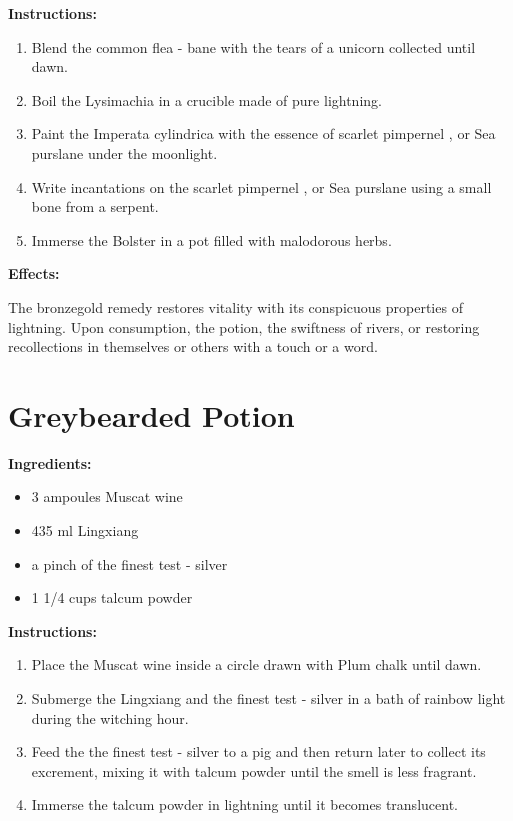 \documentclass{article}
\begin{document}
\textbf{Instructions:}

\begin{enumerate}
  \item Blend the common flea - bane with the tears of a unicorn collected until dawn.
  \item Boil the Lysimachia in a crucible made of pure lightning.
  \item Paint the Imperata cylindrica with the essence of scarlet pimpernel , or Sea purslane under the moonlight.
  \item Write incantations on the scarlet pimpernel , or Sea purslane using a small bone from a serpent.
  \item Immerse the Bolster in a pot filled with malodorous herbs.
\end{enumerate}

\textbf{Effects:}

The bronzegold remedy restores vitality with its conspicuous properties of lightning. Upon consumption, the potion, the swiftness of rivers, or restoring recollections in themselves or others with a touch or a word.

\newpage
\section*{Greybearded Potion}

\textbf{Ingredients:}

\begin{itemize}
  \item 3 ampoules Muscat wine
  \item 435 ml Lingxiang
  \item a pinch of the finest test - silver
  \item 1 1/4 cups talcum powder
\end{itemize}

\textbf{Instructions:}

\begin{enumerate}
  \item Place the Muscat wine inside a circle drawn with Plum chalk until dawn.
  \item Submerge the Lingxiang and the finest test - silver in a bath of rainbow light during the witching hour.
  \item Feed the the finest test - silver to a pig and then return later to collect its excrement, mixing it with talcum powder until the smell is less fragrant.
  \item Immerse the talcum powder in lightning until it becomes translucent.
\end{enumerate}
\end{document}
